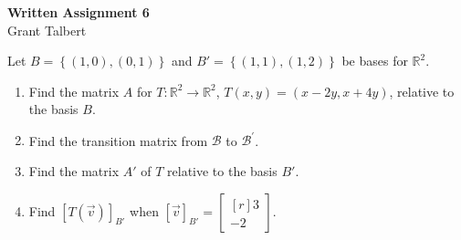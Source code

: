 \documentclass{article}
\theoremstyle{definition}
\begin{document}
\thispagestyle{fancy}
\pagestyle{fancy}
\begin{center}
\textbf{Written Assignment 6}\\
Grant Talbert
\end{center}
\begin{exercise}
  Let $B = \left\{(1, 0), (0, 1)\right\}$ and $B' = \left\{(1, 1), (1, 2)\right\}$ be bases for $\mathbb{R}^2$.
 \begin{enumerate}
 \item Find the matrix $A$ for $T:\mathbb{R}^2\rightarrow\mathbb{R}^2$, $T(x, y) = (x-2y, x+4y)$, relative to the basis $B$.
 \item Find the transition matrix from $\mathcal{B} $ to $\mathcal{B}^{\prime} $.
 \item Find the matrix $A'$ of $T$ relative to the basis $B'$.
 \item Find $[T(\vec{v})]_{B'}$ when $[\vec{v}]_{B'} = \begin{bmatrix*}[r]
 3\\-2
 \end{bmatrix*}$.
 \end{enumerate}
\end{exercise}
\end{document}
